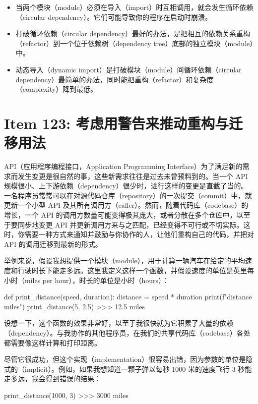 \begin{itemize}
\item 当两个模块（module）必须在导入（import）时互相调用，就会发生循环依赖（circular dependency）。它们可能导致你的程序在启动时崩溃。
\item 打破循环依赖（circular dependency）最好的办法，是把相互的依赖关系重构（refactor）到一个位于依赖树（dependency tree）底部的独立模块（module）中。
\item 动态导入（dynamic import）是打破模块（module）间循环依赖（circular dependency）最简单的办法，同时能把重构（refactor）和复杂度（complexity）降到最低。
\end{itemize}

\section{Item 123: 考虑用警告来推动重构与迁移用法}

API（应用程序编程接口，Application Programming Interface）为了满足新的需求而发生变更是很自然的事，这些新需求往往是过去未曾预料到的。当一个 API 规模很小、上下游依赖（dependency）很少时，进行这样的变更是直截了当的。一名程序员常常可以在对源代码仓库（repository）的一次提交（commit）中，就更新一个小型 API 及其所有调用方（caller）。然而，随着代码库（codebase）的增长，一个 API 的调用方数量可能变得极其庞大，或者分散在多个仓库中，以至于要同步地变更 API 并更新调用方来与之匹配，已经变得不可行或不切实际。这时，你需要一种方式来通知并鼓励与你协作的人，让他们重构自己的代码，并把对 API 的调用迁移到最新的形式。

举例来说，假设我想提供一个模块（module），用于计算一辆汽车在给定的平均速度和行驶时长下能走多远。这里我定义这样一个函数，并假设速度的单位是英里每小时（miles per hour），时长的单位是小时（hours）：

\begin{codebox}[python]
def print_distance(speed, duration):
    distance = speed * duration
    print(f"{distance} miles")
print_distance(5, 2.5)
>>>
12.5 miles
\end{codebox}

设想一下，这个函数的效果非常好，以至于我很快就为它积累了大量的依赖（dependency）。与我协作的其他程序员，在我们的共享代码库（codebase）各处都需要像这样计算和打印距离。

尽管它很成功，但这个实现（implementation）很容易出错，因为参数的单位是隐式的（implicit）。例如，如果我想知道一颗子弹以每秒 1000 米的速度飞行 3 秒能走多远，我会得到错误的结果：

\begin{codebox}[python]
print_distance(1000, 3)
>>>
3000 miles
\end{codebox}

